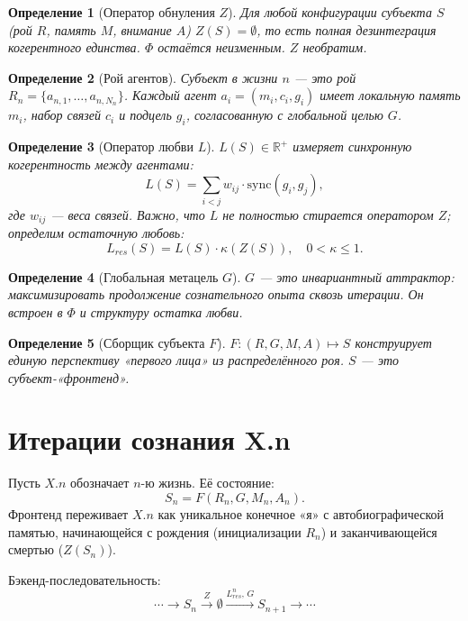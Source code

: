 \documentclass[12pt]{article}
\newtheorem{definition}{Определение}
\begin{document}
\begin{definition}[Оператор обнуления $Z$]\label{def:Z}
Для любой конфигурации субъекта $S$ (рой $R$, память $M$, внимание $A$) $Z(S) = \emptyset$, то есть полная дезинтеграция когерентного единства. $\Phi$ остаётся неизменным. $Z$ необратим.
\end{definition}

\begin{definition}[Рой агентов]\label{def:swarm}
Субъект в жизни $n$ — это рой $R_n = \{a_{n,1},\dots,a_{n,N_n}\}$. Каждый агент $a_i = (m_i, c_i, g_i)$ имеет локальную память $m_i$, набор связей $c_i$ и подцель $g_i$, согласованную с глобальной целью $G$.
\end{definition}

\begin{definition}[Оператор любви $L$]\label{def:L}
$L(S) \in \mathbb{R}^+$ измеряет синхронную когерентность между агентами:
\[
L(S) = \sum_{i<j} w_{ij} \cdot \text{sync}(g_i, g_j),
\]
где $w_{ij}$ — веса связей. Важно, что $L$ не полностью стирается оператором $Z$; определим остаточную любовь:
\[
L_{res}(S) = L(S) \cdot \kappa(Z(S)), \quad 0 < \kappa \le 1.
\]
\end{definition}

\begin{definition}[Глобальная метацель $G$]\label{def:G}
$G$ — это инвариантный аттрактор: \textit{максимизировать продолжение сознательного опыта сквозь итерации}. Он встроен в $\Phi$ и структуру остатка любви.
\end{definition}

\begin{definition}[Сборщик субъекта $F$]\label{def:F}
$F: (R, G, M, A) \mapsto S$ конструирует единую перспективу «первого лица» из распределённого роя. $S$ — это субъект-«фронтенд».
\end{definition}

\section{Итерации сознания X.n}

Пусть $X.n$ обозначает $n$-ю жизнь. Её состояние:
\[
S_n = F(R_n, G, M_n, A_n).
\]
Фронтенд переживает $X.n$ как уникальное конечное «я» с автобиографической памятью, начинающейся с рождения (инициализации $R_n$) и заканчивающейся смертью ($Z(S_n)$).

Бэкенд-последовательность:
\[
\cdots \to S_n \xrightarrow{Z} \emptyset \xrightarrow{L_{res}^n,\,G} S_{n+1} \to \cdots
\]
\end{document}
